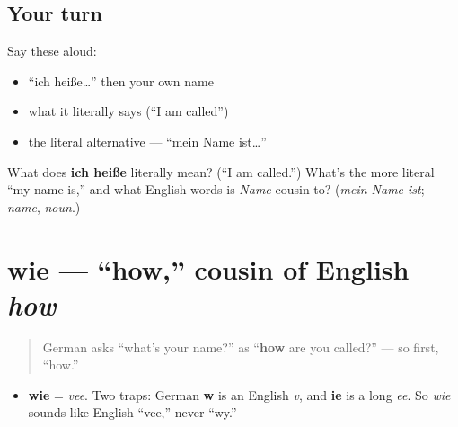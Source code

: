 \subsection*{Your turn}
Say these aloud:

\begin{itemize}
\raggedright
  \item \textquotedblleft{}ich heiße…\textquotedblright{} then your own name
  \item what it literally says (\textquotedblleft{}I am called\textquotedblright{})
  \item the literal alternative — \textquotedblleft{}mein Name ist…\textquotedblright{}
\end{itemize}

\begin{tcolorbox}[breakable,colback=teal!4,colframe=teal!35!black,title={Before you move on}]
What does \textbf{ich heiße} literally mean? (\textquotedblleft{}I am called.\textquotedblright{}) What's the more literal \textquotedblleft{}my name is,\textquotedblright{} and what English words is \emph{Name} cousin to? (\emph{mein Name ist}; \emph{name}, \emph{noun}.)
\end{tcolorbox}
\section[wie]{wie — \textquotedblleft{}how,\textquotedblright{} cousin of English \emph{how}}

\label{lesson:GE-C02-wie}



\begin{quote}
German asks \textquotedblleft{}what's your name?\textquotedblright{} as \textquotedblleft{}\textbf{how} are you called?\textquotedblright{} — so first, \textquotedblleft{}how.\textquotedblright{}
\end{quote}

\begin{sounds}
\begin{itemize}
\raggedright
  \item \textbf{wie} = \emph{vee}. Two traps: German \textbf{w} is an English \emph{v}, and \textbf{ie} is a long \emph{ee}. So \emph{wie} sounds like English \textquotedblleft{}vee,\textquotedblright{} never \textquotedblleft{}wy.\textquotedblright{}
\end{itemize}
\end{sounds}

